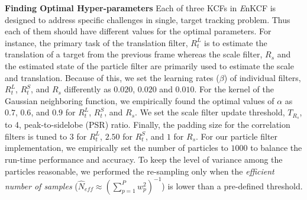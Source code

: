 \documentclass[10pt,twocolumn,letterpaper]{article}
\begin{document}
\textbf{Finding Optimal Hyper-parameters} Each of three KCFs in {\it
  E}nKCF is designed to address specific challenges in single, target
tracking problem. Thus each of them should have different values for
the optimal parameters. For instance, the primary task of the
translation filter, $R_{t}^{L}$ is to estimate the translation of a
target from the previous frame whereas the scale filter, $R_{s}$ and
the estimated state of the particle filter are primarily used to
estimate the scale and translation. Because of this, we set the
learning rates ($\beta$) of individual filters, $R_{t}^{L}$,
$R_{t}^{S}$, and $R_{s}$ differently as $0.020$, $0.020$ and
$0.010$. For the kernel of the Gaussian neighboring function, we
empirically found the optimal values of $\alpha$ as $0.7$, $0.6$, and
$0.9$ for $R_{t}^{L}$, $R_{t}^{S}$, and $R_{s}$. We set the scale
filter update threshold, $T_{R_{s}}$, to 4, peak-to-sidelobe (PSR)
ratio. Finally, the padding size for the correlation filters is tuned
to $3$ for $R_{t}^{L}$, $2.50$ for $R_{t}^{S}$, and $1$ for
$R_{s}$. For our particle filter implementation, we empirically set
the number of particles to $1000$ to balance the run-time performance
and accuracy. To keep the level of variance among the particles
reasonable, we performed the re-sampling only when the
\textit{efficient number of samples} ($ \hat{N}_{eff} \approx
(\sum_{p=1}^{P}w_{p}^{2})^{-1} $) is lower than a pre-defined
threshold.
\end{document}
